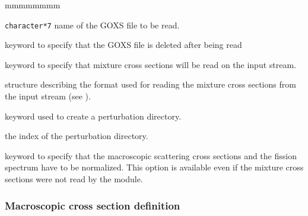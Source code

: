 \begin{ListeDeDescription}{mmmmmmmm}
\item[\dusa{GOXSRN}] {\tt character*7} name of the GOXS file to be read.

\item[\moc{DELE}] keyword to specify that the GOXS file is deleted after being read

\item[\moc{INPUT}] keyword to specify that mixture cross sections will be
read on the input stream.

\item[\dstr{descxs}] structure describing the format used for reading the
mixture cross sections from the input stream (see
).

\item[\moc{STEP}] keyword used to create a perturbation directory.

\item[\dusa{istep}] the index of the perturbation directory.

\item[\moc{NORM}] keyword to specify that the macroscopic scattering cross
sections and the fission spectrum have to be normalized. This option is
available even if the mixture cross sections were not read by the 
module.

\end{ListeDeDescription}

\goodbreak

\subsubsection{Macroscopic cross section definition}\label{sect:descxs}

